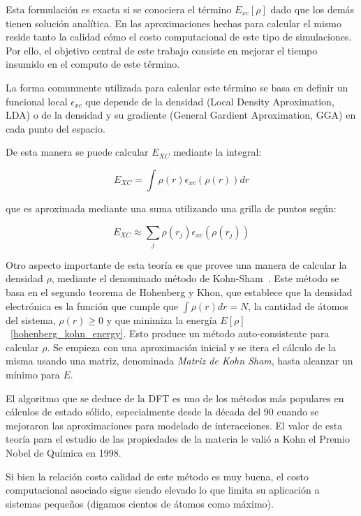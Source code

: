 Esta formulaci\'on es exacta si se conociera el t\'ermino $E_{xc}[\rho]$ dado que los dem\'as tienen soluci\'on anal\'itica. En las aproximaciones hechas para calcular el mismo reside tanto la calidad c\'omo el costo
computacional de este tipo de simulaciones. Por ello, el objetivo central de este trabajo consiste en mejorar el tiempo insumido en el computo de este t\'ermino.

La forma comunmente utilizada para calcular este t\'ermino se basa en definir un funcional local $\epsilon_{xc}$ que depende de la densidad (Local Density Aproximation, LDA) o de la densidad y su gradiente
(General Gardient Aproximation, GGA) en cada punto del espacio.

De esta manera se puede calcular $ E_{XC} $ mediante la integral:

\begin{equation}
    E_{XC} = \int \rho(r) \epsilon_{xc}\left( \rho(r) \right ) dr
\end{equation}

que es aproximada mediante una suma utilizando una grilla de puntos seg\'un:

\begin{equation}
    \label{approx_excenergy}
    E_{XC} \approx \sum_j \rho(r_j) \epsilon_{xc} (\rho(r_j))
\end{equation}

Otro aspecto importante de esta teor\'ia es que provee una manera de calcular la densidad $\rho$,
mediante el denominado m\'etodo de Kohn-Sham~\cite{KohnSham}. Este m\'etodo se basa en el segundo teorema
de Hohenberg y Khon, que establece que la densidad electr\'onica es la funci\'on que
cumple que $\int \rho(r) dr = N$, la cantidad de \'atomos del sistema, $\rho(r) \geq 0$ y que
minimiza la energ\'ia $E[\rho]$~\ref{hohenberg_kohn_energy}. Esto produce
un m\'etodo auto-consistente para calcular $\rho$. Se empieza con una aproximaci\'on inicial y
se itera el c\'alculo de la misma usando una matriz, denominada \textit{Matriz de Kohn Sham}, hasta
alcanzar un m\'inimo para $E$.

El algoritmo que se deduce de la DFT es uno de los m\'etodos m\'as populares en c\'alculos
de estado s\'olido, especialmente desde la d\'ecada del 90 cuando se mejoraron las aproximaciones para modelado de
interacciones. El valor de esta teor\'ia para el estudio de las propiedades de la materia le vali\'o a Kohn el Premio Nobel
de Qu\'imica en 1998.

Si bien la relaci\'on costo calidad de este m\'etodo es muy buena, el costo computacional asociado sigue siendo elevado lo que limita su aplicaci\'on a sistemas peque\~nos (digamos cientos de \'atomos como m\'aximo).


